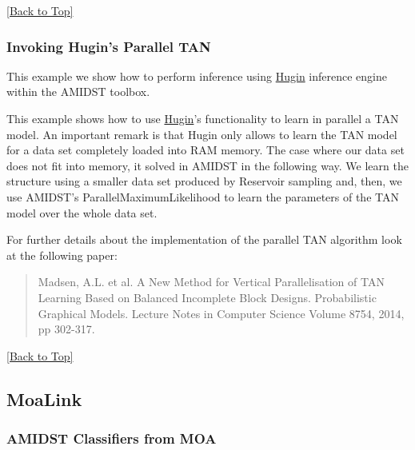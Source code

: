 \documentclass[10pt,a4paper]{article}
\begin{document}
\hyperref[sec:bns]{[Back to Top]}\newline 



\subsubsection{Invoking Hugin's Parallel TAN}\label{sec:bns:huginlink:huginTAN}
This example we show how to perform inference using \href{http://www.hugin.com}{Hugin} inference engine within the AMIDST toolbox.\newline 

This example shows how to use \href{http://www.hugin.com}{Hugin}'s functionality to learn in parallel a TAN model. An important remark is that Hugin only allows to learn the TAN model for a data set completely loaded into RAM memory. The case where our data set does not fit into memory, it solved in AMIDST in the following way. We learn the structure using a smaller data set produced by Reservoir sampling and, then, we use AMIDST's ParallelMaximumLikelihood to learn the parameters of the TAN model over the whole data set.\newline 

For further details about the implementation of the parallel TAN algorithm look at the following paper:
\begin{quotation}
Madsen, A.L. et al. A New Method for Vertical Parallelisation of TAN Learning Based on Balanced Incomplete Block Designs. Probabilistic Graphical Models. Lecture Notes in Computer Science Volume 8754, 2014, pp 302-317.
\end{quotation}


\hyperref[sec:bns]{[Back to Top]}\newline 



\subsection{MoaLink}\label{sec:bns:moalink}
\subsubsection{AMIDST Classifiers from MOA}\label{sec:bns:moalink:moaclass}
\end{document}
